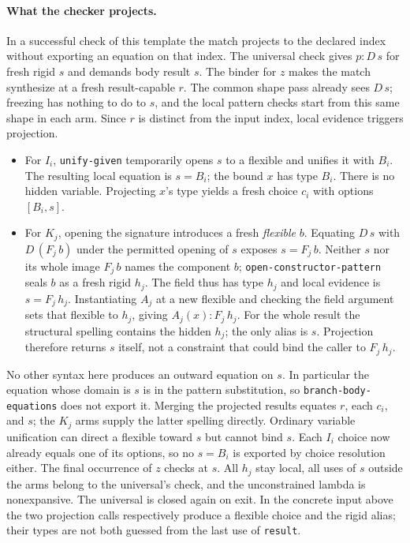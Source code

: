 \documentclass[11pt]{article}
\theoremstyle{definition}
\newcommand{\code}[1]{\texttt{#1}}
\newcommand{\src}[1]{\nolinkurl{#1}}
\begin{document}
\paragraph{What the checker projects.}
In a successful check of this template the match projects to the declared
index without exporting an equation on that index. The universal check gives
$p:D\,s$ for fresh rigid $s$ and demands body result $s$. The binder for
$z$ makes the match synthesize at a fresh result-capable $r$. The common
shape pass already sees $D\,s$; freezing has nothing to do to $s$, and
the local pattern checks start from this same shape in each arm. Since
$r$ is distinct from the input index, local evidence triggers projection.
\begin{itemize}
\item For $I_i$, \src{unify-given} temporarily opens $s$ to a flexible and
unifies it with $B_i$. The resulting local equation is $s=B_i$;
the bound $x$ has type $B_i$. There is no hidden variable. Projecting $x$'s
type yields a fresh choice $c_i$ with options $[B_i,s]$.
\item For $K_j$, opening the signature introduces a fresh \emph{flexible}
$b$. Equating $D\,s$ with $D\,(F_j\,b)$ under the permitted opening of
$s$ exposes $s=F_j\,b$. Neither $s$ nor its whole image $F_j\,b$ names
the component $b$; \src{open-constructor-pattern} seals $b$ as a fresh
rigid $h_j$. The field thus has type $h_j$ and local evidence is
$s=F_j\,h_j$. Instantiating $A_j$ at a new flexible and checking the
field argument sets that flexible to $h_j$, giving $A_j(x):F_j\,h_j$.
For the whole result the structural spelling contains the hidden $h_j$;
the only alias is $s$. Projection therefore returns $s$ itself, not a
constraint that could bind the caller to $F_j\,h_j$.
\end{itemize}
No other syntax here produces an outward equation on $s$. In particular
the equation whose domain is $s$ is in the pattern substitution, so
\src{branch-body-equations} does not export it. Merging the projected
results equates $r$, each $c_i$, and $s$; the $K_j$ arms supply the latter
spelling directly. Ordinary variable unification can direct a flexible
toward $s$ but cannot bind $s$. Each $I_i$ choice now already equals one
of its options, so no $s=B_i$ is exported by choice resolution either.
The final occurrence of $z$ checks at $s$. All $h_j$ stay local, all
uses of $s$ outside the arms belong to the universal's check, and the
unconstrained lambda is nonexpansive. The universal is closed again on
exit. In the concrete input above the two projection calls respectively
produce a flexible choice and the rigid alias; their types are not both
guessed from the last use of \code{result}.
\end{document}
